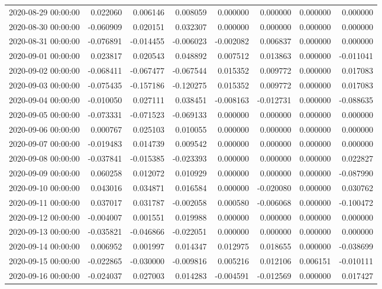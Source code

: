 \begin{tabular}{lrrrrrrr}
2020-08-29 00:00:00 & 0.022060 & 0.006146 & 0.008059 & 0.000000 & 0.000000 & 0.000000 & 0.000000 \\
2020-08-30 00:00:00 & -0.060909 & 0.020151 & 0.032307 & 0.000000 & 0.000000 & 0.000000 & 0.000000 \\
2020-08-31 00:00:00 & -0.076891 & -0.014455 & -0.006023 & -0.002082 & 0.006837 & 0.000000 & 0.000000 \\
2020-09-01 00:00:00 & 0.023817 & 0.020543 & 0.048892 & 0.007512 & 0.013863 & 0.000000 & -0.011041 \\
2020-09-02 00:00:00 & -0.068411 & -0.067477 & -0.067544 & 0.015352 & 0.009772 & 0.000000 & 0.017083 \\
2020-09-03 00:00:00 & -0.075435 & -0.157186 & -0.120275 & 0.015352 & 0.009772 & 0.000000 & 0.017083 \\
2020-09-04 00:00:00 & -0.010050 & 0.027111 & 0.038451 & -0.008163 & -0.012731 & 0.000000 & -0.088635 \\
2020-09-05 00:00:00 & -0.073331 & -0.071523 & -0.069133 & 0.000000 & 0.000000 & 0.000000 & 0.000000 \\
2020-09-06 00:00:00 & 0.000767 & 0.025103 & 0.010055 & 0.000000 & 0.000000 & 0.000000 & 0.000000 \\
2020-09-07 00:00:00 & -0.019483 & 0.014739 & 0.009542 & 0.000000 & 0.000000 & 0.000000 & 0.000000 \\
2020-09-08 00:00:00 & -0.037841 & -0.015385 & -0.023393 & 0.000000 & 0.000000 & 0.000000 & 0.022827 \\
2020-09-09 00:00:00 & 0.060258 & 0.012072 & 0.010929 & 0.000000 & 0.000000 & 0.000000 & -0.087990 \\
2020-09-10 00:00:00 & 0.043016 & 0.034871 & 0.016584 & 0.000000 & -0.020080 & 0.000000 & 0.030762 \\
2020-09-11 00:00:00 & 0.037017 & 0.031787 & -0.002058 & 0.000580 & -0.006068 & 0.000000 & -0.100472 \\
2020-09-12 00:00:00 & -0.004007 & 0.001551 & 0.019988 & 0.000000 & 0.000000 & 0.000000 & 0.000000 \\
2020-09-13 00:00:00 & -0.035821 & -0.046866 & -0.022051 & 0.000000 & 0.000000 & 0.000000 & 0.000000 \\
2020-09-14 00:00:00 & 0.006952 & 0.001997 & 0.014347 & 0.012975 & 0.018655 & 0.000000 & -0.038699 \\
2020-09-15 00:00:00 & -0.022865 & -0.030000 & -0.009816 & 0.005216 & 0.012106 & 0.006151 & -0.010111 \\
2020-09-16 00:00:00 & -0.024037 & 0.027003 & 0.014283 & -0.004591 & -0.012569 & 0.000000 & 0.017427 \\

\end{tabular}
